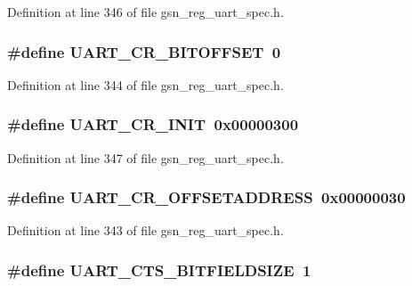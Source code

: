 Definition at line 346 of file gsn\_\-reg\_\-uart\_\-spec.h.

\hypertarget{a00575_aa7fb6e3b8d5935c326c8de3221a5128a}{
\subsubsection[{UART\_\-CR\_\-BITOFFSET}]{\setlength{\rightskip}{0pt plus 5cm}\#define UART\_\-CR\_\-BITOFFSET~0}}
\label{a00575_aa7fb6e3b8d5935c326c8de3221a5128a}


Definition at line 344 of file gsn\_\-reg\_\-uart\_\-spec.h.

\hypertarget{a00575_ab0f4b31beb10fa434452e71cc798ee5c}{
\subsubsection[{UART\_\-CR\_\-INIT}]{\setlength{\rightskip}{0pt plus 5cm}\#define UART\_\-CR\_\-INIT~0x00000300}}
\label{a00575_ab0f4b31beb10fa434452e71cc798ee5c}


Definition at line 347 of file gsn\_\-reg\_\-uart\_\-spec.h.

\hypertarget{a00575_a7c5da79127f15b373acdd760d97804f8}{
\subsubsection[{UART\_\-CR\_\-OFFSETADDRESS}]{\setlength{\rightskip}{0pt plus 5cm}\#define UART\_\-CR\_\-OFFSETADDRESS~0x00000030}}
\label{a00575_a7c5da79127f15b373acdd760d97804f8}


Definition at line 343 of file gsn\_\-reg\_\-uart\_\-spec.h.

\hypertarget{a00575_aed166ab8f128972a231114ac6c6d3cae}{
\subsubsection[{UART\_\-CTS\_\-BITFIELDSIZE}]{\setlength{\rightskip}{0pt plus 5cm}\#define UART\_\-CTS\_\-BITFIELDSIZE~1}}
\label{a00575_aed166ab8f128972a231114ac6c6d3cae}


